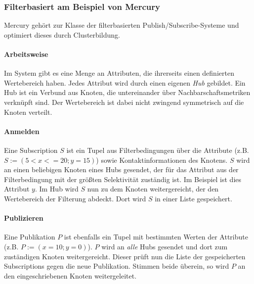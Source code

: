 \subsubsection{Filterbasiert am Beispiel von Mercury}
\label{chap:related:mercury}
Mercury \cite{Bharambe2004Mercury} gehört zur Klasse der filterbasierten Publish/Subscribe-Systeme und optimiert dieses durch Clusterbildung.

\paragraph*{Arbeitsweise}
Im System gibt es eine Menge an Attributen, die ihrerseits einen definierten Wertebereich haben. Jedes Attribut wird durch einen eigenen \emph{Hub} gebildet. Ein Hub ist ein Verbund aus Knoten, die untereinander über Nachbarschaftsmetriken verknüpft sind. Der Wertebereich ist dabei nicht zwingend symmetrisch auf die Knoten verteilt.

\paragraph*{Anmelden}
Eine Subscription $S$ ist ein Tupel aus Filterbedingungen über die Attribute (z.B. $S := (5 < x <= 20; y = 15)$) sowie Kontaktinformationen des Knotens. $S$ wird an einen beliebigen Knoten eines Hubs gesendet, der für das Attribut aus der Filterbedingung mit der größten Selektivität zuständig ist. Im Beispiel ist dies Attribut $y$. Im Hub wird $S$ nun zu dem Knoten weitergereicht, der den Wertebereich der Filterung abdeckt. Dort wird $S$ in einer Liste gespeichert.

\paragraph*{Publizieren}
Eine Publikation $P$ ist ebenfalls ein Tupel mit bestimmten Werten der Attribute (z.B. $P := (x = 10; y = 0)$). $P$ wird an \emph{alle} Hubs gesendet und dort zum zuständigen Knoten weitergereicht. Dieser prüft nun die Liste der gespeicherten Subscriptions gegen die neue Publikation. Stimmen beide überein, so wird $P$ an den eingeschriebenen Knoten weitergeleitet.


